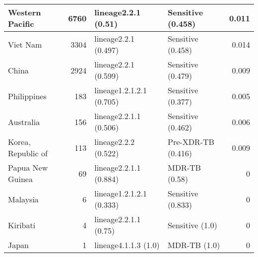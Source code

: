 \begin{tabular}{lrllr}
 Western Pacific                              &          6760 & lineage2.2.1 (0.51)      & Sensitive (0.458)   &      0.011 \\
 \hline

 Viet Nam                                     &          3304 & lineage2.2.1 (0.497)     & Sensitive (0.458)   &      0.014 \\
 China                                        &          2924 & lineage2.2.1 (0.599)     & Sensitive (0.479)   &      0.009 \\
 Philippines                                  &           183 & lineage1.2.1.2.1 (0.705) & Sensitive (0.377)   &      0.005 \\
 Australia                                    &           156 & lineage2.2.1.1 (0.506)   & Sensitive (0.462)   &      0.006 \\
 Korea, Republic of                           &           113 & lineage2.2.2 (0.522)     & Pre-XDR-TB (0.416)  &      0.009 \\
 Papua New Guinea                             &            69 & lineage2.2.1.1 (0.884)   & MDR-TB (0.58)       &      0     \\
 Malaysia                                     &             6 & lineage1.2.1.2.1 (0.333) & Sensitive (0.833)   &      0     \\
 Kiribati                                     &             4 & lineage2.2.1.1 (0.75)    & Sensitive (1.0)     &      0     \\
 Japan                                        &             1 & lineage4.1.1.3 (1.0)     & MDR-TB (1.0)        &      0     \\
\hline
\end{tabular}